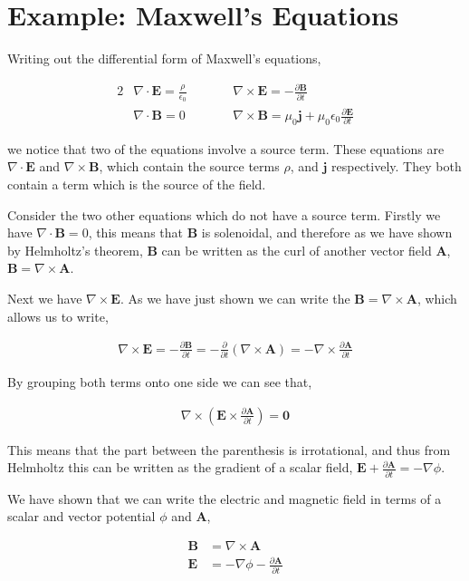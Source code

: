 \documentclass[11pt]{amsart}
\begin{document}
\section{Example: Maxwell's Equations}

Writing out the differential form of Maxwell's equations,

\begin{alignat*}{2}
  &\nabla\cdot\mathbf{E}=\frac{\rho}{\epsilon_0}\qquad&&\nabla\times\mathbf{E}=-\frac{\partial\mathbf{B}}{\partial t} \\
  &\nabla\cdot\mathbf{B}=0\qquad&&\nabla\times\mathbf{B}=\mu_0\mathbf{j}+\mu_0\epsilon_0\frac{\partial\mathbf{E}}{\partial t}
\end{alignat*}

we notice that two of the equations involve a source term. These equations are $\nabla\cdot\mathbf{E}$ and $\nabla\times\mathbf{B}$, which contain the source terms $\rho$, and $\mathbf{j}$ respectively. They both contain a term which is the source of the field.

Consider the two other equations which do not have a source term. Firstly we have $\nabla\cdot\mathbf{B}=0$, this means that $\mathbf{B}$ is solenoidal, and therefore as we have shown by Helmholtz's theorem, $\mathbf{B}$ can be written as the curl of another vector field $\mathbf{A}$, $\mathbf{B}=\nabla\times\mathbf{A}$.

Next we have $\nabla\times\mathbf{E}$. As we have just shown we can write the $\mathbf{B}=\nabla\times\mathbf{A}$, which allows us to write,

\begin{align*}
  \nabla\times\mathbf{E} = -\frac{\partial\mathbf{B}}{\partial t} = -\frac{\partial}{\partial t}(\nabla\times\mathbf{A}) = -\nabla\times\frac{\partial\mathbf{A}}{\partial t}
\end{align*}

By grouping both terms onto one side we can see that,

\begin{align*}
  \nabla\times\left(\mathbf{E}\times\frac{\partial\mathbf{A}}{\partial t}\right) = \mathbf{0}
\end{align*}

This means that the part between the parenthesis is irrotational, and thus from Helmholtz this can be written as the gradient of a scalar field, $\mathbf{E} + \frac{\partial\mathbf{A}}{\partial t} = -\nabla\phi$.

We have shown that we can write the electric and magnetic field in terms of a scalar and vector potential $\phi$ and $\mathbf{A}$,

\begin{align*}
  \mathbf{B}&=\nabla\times\mathbf{A}\\
  \mathbf{E}&=-\nabla\phi-\frac{\partial\mathbf{A}}{\partial t}
\end{align*}
\end{document}
